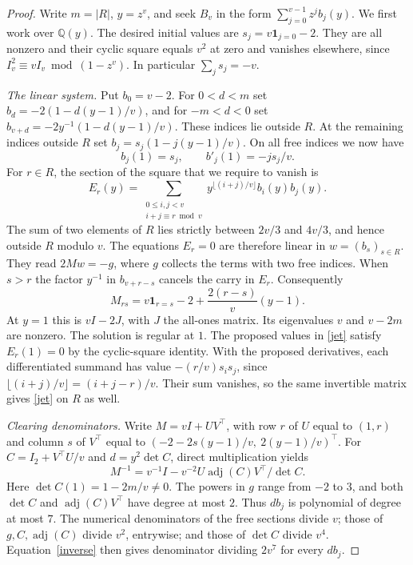 \documentclass[10pt,a4paper,reqno]{amsart}
\newcommand{\QQ}{\mathbb Q}
\newcommand{\ind}{\mathbf1}
\begin{document}
\begin{proof}
Write $m=|R|$, $y=z^v$, and seek $B_v$ in the form $\sum_{j=0}^{v-1}z^j b_j(y)$. We first work over $\QQ(y)$. The desired initial values are $s_j=v\ind_{j=0}-2$. They are all nonzero and their cyclic square equals $v^2$ at zero and vanishes elsewhere, since $I_v^2\equiv v I_v\bmod(1-z^v)$. In particular $\sum_j s_j=-v$.

\smallskip\noindent\emph{The linear system.}
Put $b_0=v-2$. For $0<d<m$ set $b_d=-2(1-d(y-1)/v)$, and for $-m<d<0$ set $b_{v+d}=-2y^{-1}(1-d(y-1)/v)$. These indices lie outside $R$. At the remaining indices outside $R$ set $b_j=s_j(1-j(y-1)/v)$. On all free indices we now have
\begin{equation}\label{jet}
                 b_j(1)=s_j,\qquad b'_j(1)=-js_j/v.
\end{equation}
For $r\in R$, the section of the square that we require to vanish is
\[
 E_r(y)=\sum_{\substack{0\le i,j<v\\i+j\equiv r\bmod v}}
                   y^{\lfloor(i+j)/v\rfloor}b_i(y)b_j(y).
\]
The sum of two elements of $R$ lies strictly between $2v/3$ and $4v/3$, and hence outside $R$ modulo $v$. The equations $E_r=0$ are therefore linear in $w=(b_s)_{s\in R}$. They read $2Mw=-g$, where $g$ collects the terms with two free indices. When $s>r$ the factor $y^{-1}$ in $b_{v+r-s}$ cancels the carry in $E_r$. Consequently
\[
                  M_{rs}=v\ind_{r=s}-2+\frac{2(r-s)}v(y-1).
\]
At $y=1$ this is $vI-2J$, with $J$ the all-ones matrix. Its eigenvalues $v$ and $v-2m$ are nonzero. The solution is regular at $1$. The proposed values in \eqref{jet} satisfy $E_r(1)=0$ by the cyclic-square identity. With the proposed derivatives, each differentiated summand has value $-(r/v)s_i s_j$, since $\lfloor(i+j)/v\rfloor=(i+j-r)/v$. Their sum vanishes, so the same invertible matrix gives \eqref{jet} on $R$ as well.

\smallskip\noindent\emph{Clearing denominators.}
Write $M=vI+UV^\top$, with row $r$ of $U$ equal to $(1,r)$ and column $s$ of $V^\top$ equal to $(-2-2s(y-1)/v,\ 2(y-1)/v)^\top$. For $C=I_2+V^\top U/v$ and $d=y^2\det C$, direct multiplication yields
\begin{equation}\label{inverse}
 M^{-1}=v^{-1}I-v^{-2}U\operatorname{adj}(C)V^\top/\det C.
\end{equation}
Here $\det C(1)=1-2m/v\ne0$. The powers in $g$ range from $-2$ to $3$, and both $\det C$ and $\operatorname{adj}(C)V^\top$ have degree at most $2$. Thus $db_j$ is polynomial of degree at most $7$. The numerical denominators of the free sections divide $v$; those of $g,C,\operatorname{adj}(C)$ divide $v^2$, entrywise; and those of $\det C$ divide $v^4$. Equation~\eqref{inverse} then gives denominator dividing $2v^7$ for every $db_j$.


\end{proof}
\end{document}

